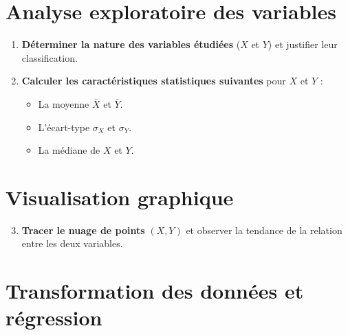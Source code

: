 \documentclass[a4paper,12pt]{article}
\begin{document}
\section{Analyse exploratoire des variables}

\begin{enumerate}
    \item \textbf{Déterminer la nature des variables étudiées} (\( X \) et \( Y \)) et justifier leur classification.
    \item \textbf{Calculer les caractéristiques statistiques suivantes} pour \( X \) et \( Y \) :
    \begin{itemize}
        \item La moyenne \( \bar{X} \) et \( \bar{Y} \).
        \item L’écart-type \( \sigma_X \) et \( \sigma_Y \).
        \item La médiane de \( X \) et \( Y \).
    \end{itemize}
\end{enumerate}

\section{Visualisation graphique}

\begin{enumerate}
    \setcounter{enumi}{2}
    \item \textbf{Tracer le nuage de points} \( (X, Y) \) et observer la tendance de la relation entre les deux variables.
\end{enumerate}

\section{Transformation des données et régression}
\end{document}
